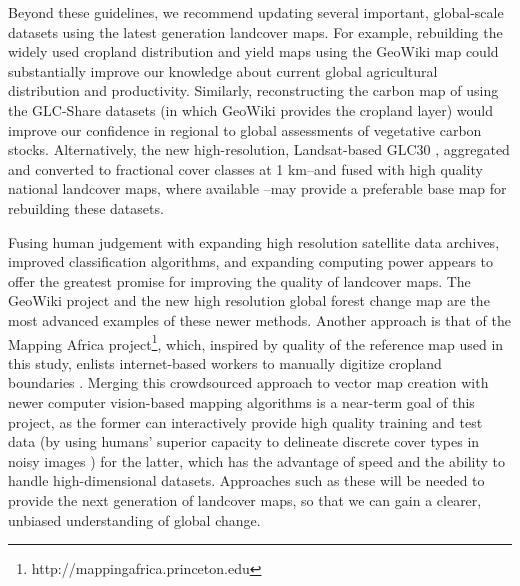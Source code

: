 \documentclass{pnastwo}
\begin{document}
\begin{article}
Beyond these guidelines, we recommend updating several important, global-scale datasets using the latest generation landcover maps. For example, rebuilding the widely used cropland distribution and yield maps \cite{monfreda_farming_2008, ramankutty_farming_2008} using the GeoWiki map could substantially improve our knowledge about current global agricultural distribution and productivity. Similarly, reconstructing the carbon map of \cite{ruesch_new_2008} using the GLC-Share datasets (in which GeoWiki provides the cropland layer) would improve our confidence in regional to global assessments of vegetative carbon stocks. Alternatively, the new high-resolution, Landsat-based GLC30 \cite{chen_global_2015}, aggregated and converted to fractional cover classes at 1 km--and fused with high quality national landcover maps, where available \cite[similar to][]{fritz_mapping_2015,fritz_cropland_2011}--may provide a preferable base map for rebuilding these datasets. 

Fusing human judgement with expanding high resolution satellite data archives, improved classification algorithms, and expanding computing power appears to offer the greatest promise for improving the quality of landcover maps. The GeoWiki project and the new high resolution global forest change map \cite{hansen_high-resolution_2013} are the most advanced examples of these newer methods. Another approach is that of the Mapping Africa project\footnote{http://mappingafrica.princeton.edu}, which, inspired by quality of the reference map used in this study, enlists internet-based workers to manually digitize cropland boundaries \cite{estes_diylandcover:_2015}. Merging this crowdsourced approach to vector map creation with newer computer vision-based mapping algorithms \cite{debats_generalized_????} is a near-term goal of this project, as the former can interactively provide high quality training and test data (by using humans' superior capacity to delineate discrete cover types in noisy images \cite{estes_diylandcover:_2015}) for the latter, which has the advantage of speed and the ability to handle high-dimensional datasets. Approaches such as these will be needed to provide the next generation of landcover maps, so that we can gain a clearer, unbiased understanding of global change. 




\end{article}
\end{document}
